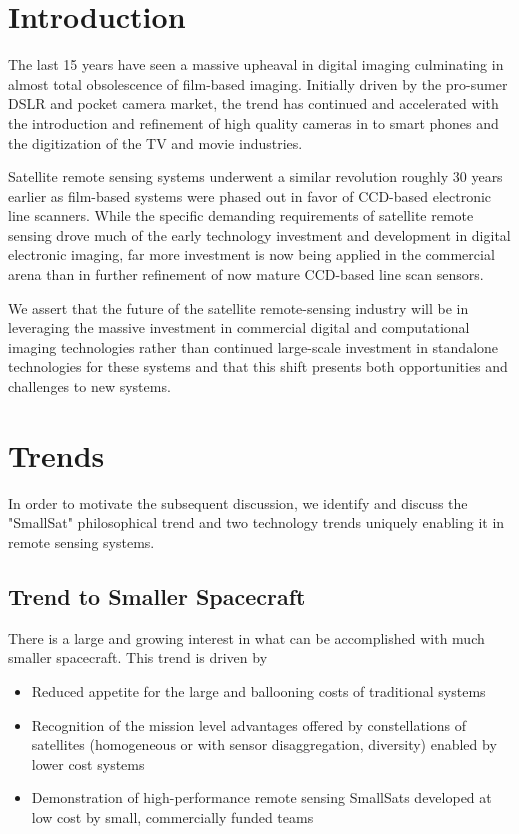 \documentclass[10pt,journal]{IEEEtran}  %
\begin{document}
\IEEEdisplaynontitleabstractindextext

\section{Introduction}
\label{sec:introduction}

The last 15 years have seen a massive upheaval in digital imaging culminating in almost total obsolescence of film-based imaging.  Initially driven by the pro-sumer DSLR and pocket camera market, the trend has continued and accelerated with the introduction and refinement of high quality cameras in to smart phones and the digitization of the TV and movie industries.

Satellite remote sensing systems underwent a similar revolution roughly 30 years earlier as film-based systems were phased out in favor of CCD-based electronic line scanners.  While the specific demanding requirements of satellite remote sensing drove much of the early technology investment and development in digital electronic imaging, far more investment is now being applied in the commercial arena than in further refinement of now mature CCD-based line scan sensors.

We assert that the future of the satellite remote-sensing industry will be in leveraging the massive investment in commercial digital and computational imaging technologies rather than continued large-scale investment in standalone technologies for these systems and that this shift presents both opportunities and challenges to new systems.

\section{Trends}
In order to motivate the subsequent discussion, we identify and discuss the "SmallSat" philosophical trend and two technology trends uniquely enabling it in remote sensing systems.

\subsection{Trend to Smaller Spacecraft}

\label{sec:smallsat}
There is a large and growing interest in what can be accomplished with much smaller spacecraft.  This trend is driven by 
\begin{itemize}
    \item Reduced appetite for the large and ballooning costs of traditional systems
    \item Recognition of the mission level advantages offered by constellations of satellites (homogeneous or with sensor disaggregation, diversity) enabled by lower cost systems
    \item Demonstration of high-performance remote sensing SmallSats developed at low cost by small, commercially funded teams
\end{itemize} 
\end{document}
